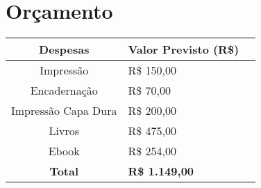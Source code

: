 \section{Orçamento}




\begin{small}
\begin{tabular}{clr}
\hline
 Despesas & Valor Previsto (R\$)   \\
\hline
 	Impressão & R\$ 150,00  \\
 	Encadernação & R\$ 70,00  \\
 	Impressão Capa Dura  & R\$ 200,00  \\
 	Livros  & R\$ 475,00  \\ 
 	Ebook  & R\$ 254,00  \\ \hline
 	\textbf{Total} & \textbf{R\$ 1.149,00} \\
\hline
\end{tabular}


\end{small}






